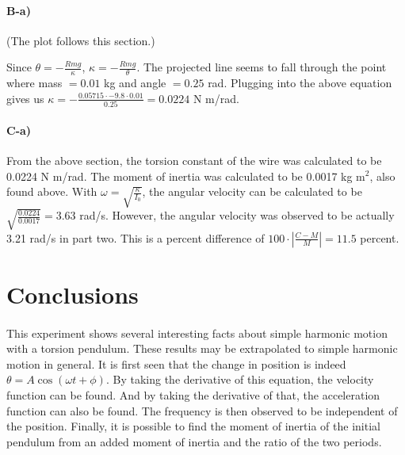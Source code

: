 \documentclass[12pt]{article}
\begin{document}
\paragraph{B-a)}
\begin{center}
(The plot follows this section.)
\end{center}

Since \(\theta = - \frac{Rmg}{\kappa}\), \(\kappa = - \frac{Rmg}{\theta}\).
The projected line seems to fall through the point where mass \(= 0.01\) kg
and angle \(= 0.25\) rad.  Plugging into the above equation gives us
\(\kappa = - \frac{0.05715\cdot -9.8\cdot 0.01}{0.25} = 0.0224\) N m/rad.

\paragraph{C-a)}
From the above section, the torsion constant of the wire was calculated to
be 0.0224 N m/rad.  The moment of inertia was calculated to be 0.0017 kg
m$^2$, also found above.  With \(\omega = \sqrt{\frac{\kappa}{I_0}}\), the
angular velocity can be calculated to be \(\sqrt{\frac{0.0224}{0.0017}} =
3.63\) rad/s.  However, the angular velocity was observed to be actually
3.21 rad/s in part two.  This is a percent difference of \(100\cdot
|\frac{C - M}{M}| = 11.5\) percent.  

\newpage

\section{Conclusions}

\paragraph{}

This experiment shows several interesting facts about simple harmonic motion
with a torsion pendulum.  These results may be extrapolated to simple 
harmonic motion in general.  It is first seen that the change in position
is indeed \(\theta = A\cos(\omega t + \phi)\).   By taking the derivative of
this equation, the velocity function can be found.  And by taking the derivative
of that, the acceleration function can also be found.  The frequency
is then observed to be independent of the position.  Finally, it is possible
to find the moment of inertia of the initial pendulum from an added moment
of inertia and the ratio of the two periods.
\end{document}
